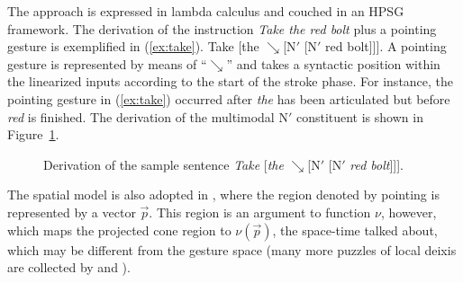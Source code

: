 \documentclass[output=paper
 	        ,biblatex
                ,babelshorthands
                ,newtxmath
                ,draftmode
                ,colorlinks, citecolor=brown
]{langscibook}
\begin{document}
The approach is expressed in lambda calculus and couched in an HPSG framework.
%
The derivation of the instruction \textit{Take the red bolt} plus a pointing gesture is exemplified in (\ref{ex:take}).
%
\ea \label{ex:take}
Take [the $\searrow$[N$'$ [N$'$ red bolt]]].
\z 
%
A pointing gesture is represented by means of \enquote{$\searrow$} and takes a syntactic position within the linearized inputs according to the start of the stroke phase. 
%
For instance, the pointing gesture in (\ref{ex:take}) occurred after \textit{the} has been articulated but before \textit{red} is finished.
%
The derivation of the multimodal N$'$ constituent is shown in Figure~\ref{fig:take-tree}.

\begin{figure}
\caption{Derivation of the sample sentence \textit{Take} [\textit{the} $\searrow$[N$'$ [N$'$ \textit{red bolt}]]].}
\label{fig:take-tree}
\end{figure}


The spatial model is also adopted in \citet{Lascarides:Stone:2009:a}, where the region denoted by pointing is represented by a vector $\vec{p}$.
%
This region is an argument to function $\nu$, however, which maps the projected cone region to $\nu(\vec{p})$, the space-time talked about, which may be different from the gesture space (many more puzzles of local deixis are collected by \citealp{Klein:1978} and \citealp{Fricke:2007:a}).
\end{document}
